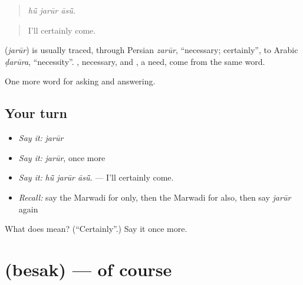 \begin{quote}
  
\end{quote}

\begin{quote}
\emph{hū̃ jarūr āsū̃.}
\end{quote}

\begin{quote}
I'll certainly come.
\end{quote}

\begin{cousinweb}
\textbf{} (\emph{jarūr}) is usually traced, through Persian \emph{zarūr}, \textquotedblleft{}necessary; certainly\textquotedblright{}, to Arabic \emph{ḍarūra}, \textquotedblleft{}necessity\textquotedblright{}. \textbf{}, necessary, and \textbf{}, a need, come from the same word.
\end{cousinweb}

\begin{grammarlens}[title={What you've built}]
One more word for asking and answering.
\end{grammarlens}

\subsection*{Your turn}
\begin{itemize}
\raggedright
  \item \emph{Say it:} \emph{jarūr}
  \item \emph{Say it:} \emph{jarūr}, once more
  \item \emph{Say it:} \emph{hū̃ jarūr āsū̃.} — I'll certainly come.
  \item \emph{Recall:} say the Marwadi for only, then the Marwadi for also, then say \emph{jarūr} again
\end{itemize}

\begin{tcolorbox}[breakable,colback=teal!4,colframe=teal!35!black,title={Before you move on}]
What does  mean? (\textquotedblleft{}Certainly\textquotedblright{}.) Say it once more.
\end{tcolorbox}
\section[\texorpdfstring{\mw{बेसक} (besak)}{बेसक (besak)}]{ (besak) — of course}

\label{lesson:MW-C272-besak}



